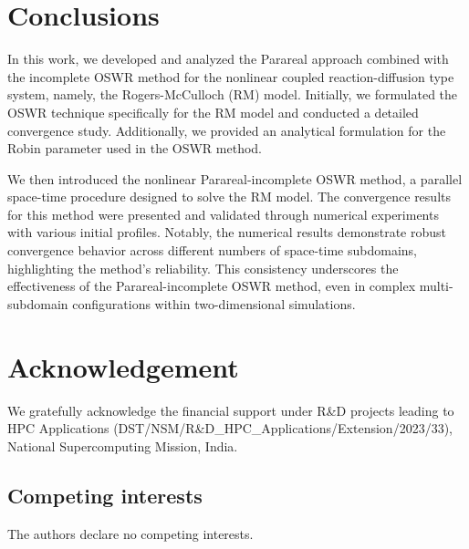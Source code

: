 \documentclass[11pt]{article}
\begin{document}
\section{Conclusions}
In this work, we developed and analyzed the Parareal approach combined with the incomplete OSWR method for the nonlinear coupled reaction-diffusion type system, namely, the Rogers-McCulloch (RM) model. Initially, we formulated the OSWR technique specifically for the RM model and conducted a detailed convergence study. Additionally, we provided an analytical formulation for the Robin parameter used in the OSWR method.

We then introduced the nonlinear Parareal-incomplete OSWR method, a parallel space-time procedure designed to solve the RM model. The convergence results for this method were presented and validated through numerical experiments with various initial profiles. Notably, the numerical results demonstrate robust convergence behavior across different numbers of space-time subdomains, highlighting the method's reliability. This consistency underscores the effectiveness of the Parareal-incomplete OSWR method, even in complex multi-subdomain configurations within two-dimensional simulations.



\section*{Acknowledgement} 
We gratefully acknowledge the financial support under R\&D projects leading to HPC Applications (DST/NSM/R\&D\_HPC\_Applications/Extension/2023/33), National Supercomputing Mission, India. 
\subsection*{Competing interests}
 The authors declare no competing interests.



\end{document}
